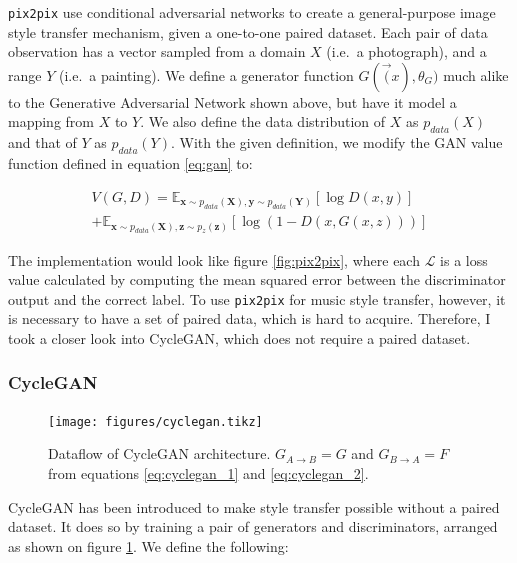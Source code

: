 \documentclass[]{article}
\begin{document}
\texttt{pix2pix} use conditional adversarial networks to create a
general-purpose image style transfer mechanism, given a one-to-one
paired dataset. Each pair of data observation has a vector sampled from
a domain \(X\) (i.e.~a photograph), and a range \(Y\) (i.e.~a painting).
We define a generator function \(G(\vec(x), \theta_G)\) much alike to
the Generative Adversarial Network shown above, but have it model a
mapping from \(X\) to \(Y\). We also define the data distribution of
\(X\) as \(p_{data}(X)\) and that of \(Y\) as \(p_{data}(Y)\). With the
given definition, we modify the GAN value function defined in equation
\ref{eq:gan} to:

\begin{multline}
    V(G, D) = \mathbb{E}_{\mathbf{x} \sim p_{data}(\mathbf{X}), \mathbf{y} \sim p_{data}(\mathbf{Y})}[\log D(x, y)] \\ +  \mathbb{E}_{\mathbf{x} \sim p_{data}(\mathbf{X}), \mathbf{z} \sim p_{z}(\mathbf{z})}[\log (1 - D(x, G(x, z)))] \label{eq:pix2pix}
\end{multline}

The implementation would look like figure \ref{fig:pix2pix}, where each
\(\mathcal{L}\) is a loss value calculated by computing the mean squared
error between the discriminator output and the correct label. To use
\texttt{pix2pix} for music style transfer, however, it is necessary to
have a set of paired data, which is hard to acquire. Therefore, I took a
closer look into CycleGAN, which does not require a paired dataset.

\hypertarget{cyclegan}{%
\subsubsection{CycleGAN}\label{cyclegan}}

\begin{figure}[h]
    \texttt{[image: figures/cyclegan.tikz]}
\centering
\caption{Dataflow of CycleGAN architecture. $G_{A \rightarrow B} = G$ and $G_{B \rightarrow A} = F$ from equations \ref{eq:cyclegan_1} and \ref{eq:cyclegan_2}. \label{fig:cyclegan}}
\end{figure}

CycleGAN has been introduced to make style transfer possible without a
paired dataset. It does so by training a pair of generators and
discriminators, arranged as shown on figure \ref{fig:cyclegan}. We
define the following:
\end{document}
